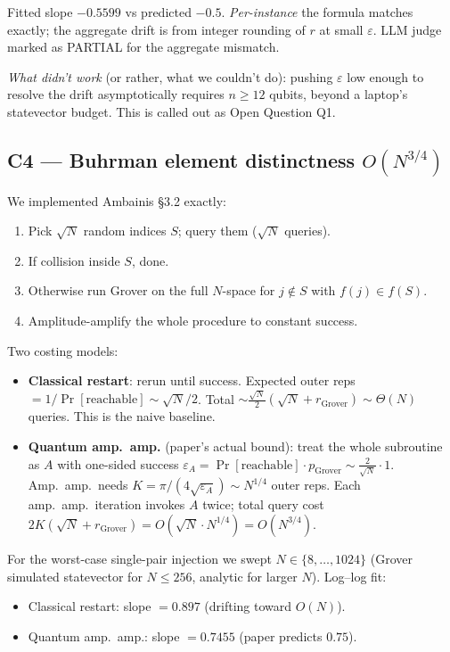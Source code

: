 \documentclass[11pt]{article}
\begin{document}
Fitted slope $-0.5599$ vs predicted $-0.5$. \emph{Per-instance} the formula
matches exactly; the aggregate drift is from integer rounding of $r$ at
small $\varepsilon$. LLM judge marked as PARTIAL for the aggregate mismatch.

\emph{What didn't work} (or rather, what we couldn't do): pushing $\varepsilon$
low enough to resolve the drift asymptotically requires $n \ge 12$ qubits,
beyond a laptop's statevector budget. This is called out as Open Question Q1.

\subsection{C4 --- Buhrman element distinctness $O(N^{3/4})$}
We implemented Ambainis \S3.2 exactly:
\begin{enumerate}
\item Pick $\sqrt{N}$ random indices $S$; query them ($\sqrt{N}$ queries).
\item If collision inside $S$, done.
\item Otherwise run Grover on the full $N$-space for $j \not\in S$ with
      $f(j) \in f(S)$.
\item Amplitude-amplify the whole procedure to constant success.
\end{enumerate}

Two costing models:
\begin{itemize}
\item \textbf{Classical restart}: rerun until success. Expected outer reps
      $= 1/\Pr[\text{reachable}] \sim \sqrt{N}/2$. Total $\sim
      \frac{\sqrt{N}}{2}(\sqrt{N} + r_{\text{Grover}}) \sim \Theta(N)$
      queries. This is the naive baseline.
\item \textbf{Quantum amp.\ amp.} (paper's actual bound): treat the whole
      subroutine as $A$ with one-sided success
      $\varepsilon_A = \Pr[\text{reachable}] \cdot p_{\text{Grover}}
                     \sim \frac{2}{\sqrt{N}} \cdot 1$.
      Amp.\ amp.\ needs $K = \pi/(4\sqrt{\varepsilon_A}) \sim N^{1/4}$ outer
      reps. Each amp.\ amp.\ iteration invokes $A$ twice; total query cost
      $2K(\sqrt{N}+r_{\text{Grover}}) = O(\sqrt{N} \cdot N^{1/4}) = O(N^{3/4})$.
\end{itemize}

For the worst-case single-pair injection we swept $N \in \{8, \dots, 1024\}$
(Grover simulated statevector for $N \le 256$, analytic for larger $N$).
Log--log fit:
\begin{itemize}
\item Classical restart: slope $= 0.897$ (drifting toward $O(N)$).
\item Quantum amp.\ amp.: slope $= \mathbf{0.7455}$ (paper predicts $0.75$).
\end{itemize}
\end{document}
